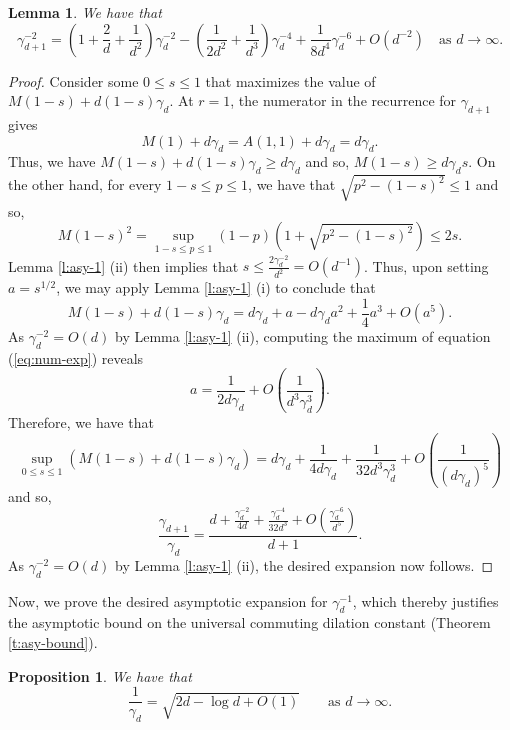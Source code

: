 \documentclass[10pt]{amsart}
\newtheorem{lemma}[theorem]{Lemma}
\newtheorem{proposition}[theorem]{Proposition}
\begin{document}
\begin{lemma}\label{l:asy-2}
    We have that
    \[
        \gamma_{d+1}^{-2} = \left( 1 + \frac{2}{d}+\frac{1}{d^2}\right)\gamma_d^{-2} - \left(\frac{1}{2d^2}+\frac{1}{d^3}\right)\gamma_d^{-4} + \frac{1}{8d^4}\gamma_d^{-6}+ O(d^{-2}) \quad \text{as $d\rightarrow\infty$}.
    \]
\end{lemma}

\begin{proof}
    Consider some $0\leq s\leq 1$ that maximizes the value of $M(1-s) + d(1-s)\gamma_d$. At $r=1$, the numerator in the recurrence for $\gamma_{d+1}$ gives
    \[
        M(1)+d\gamma_d = A(1,1) + d\gamma_d = d\gamma_d.
    \]
    Thus, we have $M(1-s) + d(1-s)\gamma_d \geq d\gamma_d$ and so, $M(1-s) \geq d\gamma_d s$. On the other hand, for every $1-s\leq p\leq 1$, we have that $\sqrt{p^2-(1-s)^2}\leq 1$ and so,
    \[
        M(1-s)^2  = \sup_{1-s\leq p\leq 1} (1-p)\left(1+ \sqrt{p^2-(1-s)^2}\right) \leq 2s.
    \]
    Lemma \ref{l:asy-1} (ii) then implies that $s\leq \frac{2\gamma_d^{-2}}{d^2} = O(d^{-1})$. Thus, upon setting $a = s^{1/2}$, we may apply Lemma \ref{l:asy-1} (i) to conclude that
    \begin{equation}\label{eq:num-exp}
        M(1-s) + d(1-s)\gamma_d = d\gamma_d + a -d\gamma_d a^2 + \frac{1}{4}a^3 +O(a^5).
    \end{equation}
    As $\gamma_d^{-2} = O(d)$ by Lemma \ref{l:asy-1} (ii), computing the maximum of equation (\ref{eq:num-exp}) reveals
    \[
        a = \frac{1}{2d\gamma_d} + O\left(\frac{1}{d^3\gamma_d^3}\right).
    \]
    Therefore, we have that
    \[
        \sup_{0\leq s\leq 1}\left( M(1-s) + d(1-s)\gamma_d \right) = d\gamma_d + \frac{1}{4d\gamma_d} + \frac{1}{32d^3\gamma_d^3} + O\left(\frac{1}{(d\gamma_d)^{5}}\right)
    \]
    and so,
    \[
        \frac{\gamma_{d+1}}{\gamma_d} = \frac{d+\frac{\gamma_d^{-2}}{4d} + \frac{\gamma_d^{-4}}{32d^3} + O\left(\frac{\gamma_d^{-6}}{d^5}\right)}{d+1}.
    \]
    As $\gamma_d^{-2} = O(d)$ by Lemma \ref{l:asy-1} (ii), the desired expansion now follows.
\end{proof}

Now, we prove the desired asymptotic expansion for $\gamma_d^{-1}$, which thereby justifies the asymptotic bound on the universal commuting dilation constant (Theorem \ref{t:asy-bound}).

\begin{proposition}\label{p:asy-3}
    We have that
    \[
        \frac{1}{\gamma_d} = \sqrt{2d-\log d + O(1)} \quad \quad \text{as $d\rightarrow\infty$.}
    \]
\end{proposition}
\end{document}
